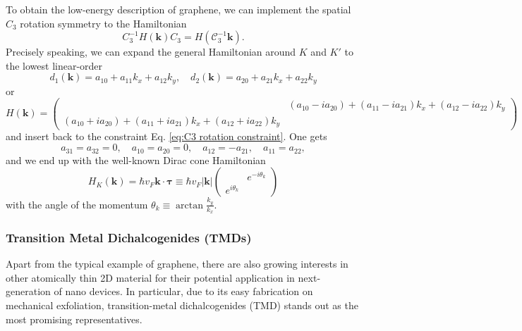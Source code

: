 To obtain the low-energy description of graphene, we can implement the spatial $C_3$ rotation symmetry to the Hamiltonian
\begin{equation}\label{eq:C3 rotation constraint}
    C_3^{-1}H(\bm k)C_3=H(\mathcal C_3^{-1}\bm k).
\end{equation}
\noindent Precisely speaking, we can expand the general Hamiltonian around $K$ and $K'$ to the lowest linear-order
\begin{equation*}
    d_1(\bm k)=a_{10}+a_{11}k_x+a_{12}k_y,\quad d_2(\bm k)=a_{20}+a_{21}k_x+a_{22}k_y
\end{equation*}
or
\begin{equation*}
    H(\bm k)=\begin{pmatrix}
                                                                 & (a_{10}-ia_{20})+(a_{11}-ia_{21})k_x+(a_{12}-ia_{22})k_y \\
        (a_{10}+ia_{20})+(a_{11}+ia_{21})k_x+(a_{12}+ia_{22})k_y &
    \end{pmatrix}
\end{equation*}
and insert back to the constraint Eq. \eqref{eq:C3 rotation constraint}. One gets
\begin{equation*}
    a_{31}=a_{32}=0,\quad a_{10}=a_{20}=0,\quad a_{12}=-a_{21},\quad a_{11}=a_{22},
\end{equation*}
and we end up with the well-known Dirac cone Hamiltonian
\begin{equation}
    H_K(\bm k)=\hbar v_F\bm k\cdot\bm\tau\equiv\hbar v_F|\bm k|\left(\begin{array}{cc}
                      & e^{-i\theta_k} \\
        e^{i\theta_k} &
    \end{array}\right)
\end{equation}
with the angle of the momentum $\theta_k\equiv\arctan\frac{k_y}{k_x}$.

\subsubsection{Transition Metal Dichalcogenides (TMDs)}
Apart from the typical example of graphene, there are also growing interests in other atomically thin 2D material for their potential application in next-generation of nano devices. In particular, due to its easy fabrication on mechanical exfoliation, transition-metal dichalcogenides (TMD) stands out as the most promising representatives.



